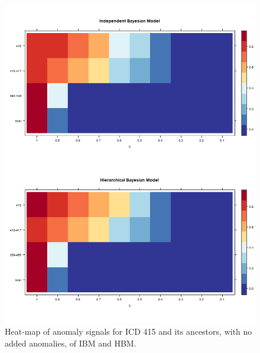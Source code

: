 \newpage%

\begin{figure}[!h]
	\centering
	\includegraphics[width=1\linewidth]{../../R-codes/JAGS/plots/mimic/heat415}
	\caption{Heat-map of anomaly signals for ICD 415 and its ancestors, with no added anomalies, of IBM and HBM.}
	\label{fig:heat415}
\end{figure}

\newpage

